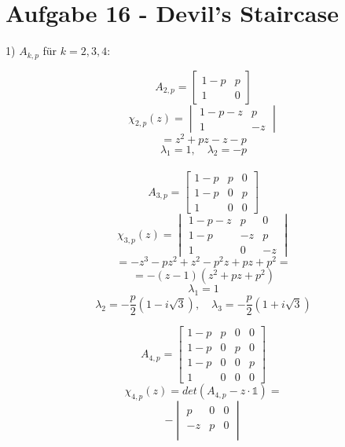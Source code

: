 \section*{Aufgabe 16 - Devil's Staircase}
\begin{paragraph}{1)}
  $A_{k,p}$ für $k = 2, 3, 4$:

  \begin{minipage}{0.4\linewidth}
  \[ A_{2,p} = \begin{bmatrix} 1-p & p \\ 1 & 0 \end{bmatrix} \]
  \[ \chi_{2,p}(z) = \begin{vmatrix} 1-p-z & p \\ 1 & -z \end{vmatrix} \]
  \[ = z^{2} + pz - z - p \]
  \[ \lambda_{1} = 1, \quad \lambda_{2}= -p \] \\[0.5em]
  \[ A_{3,p} = \begin{bmatrix} 1-p & p & 0 \\
                               1-p & 0 & p \\
                                 1 & 0 & 0 \end{bmatrix} \]
  \[ \chi_{3,p}(z) = \begin{vmatrix} 1-p-z & p  & 0 \\
                                       1-p   & -z & p \\
                                       1     & 0  & -z \end{vmatrix} \]
  \[ = -z^{3} - pz^{2} + z^{2} - p^{2}z + pz + p^{2} = \]
  \[ = -(z - 1) (z^{2} + pz + p^{2}) \]
  \[ \lambda_{1}= 1 \]
  \[ \lambda_{2}= -\frac{p}{2}(1 - i\sqrt{3}), \quad
     \lambda_{3}= -\frac{p}{2}(1 + i\sqrt{3}) \]
  \end{minipage}\hfill\begin{minipage}{0.5\linewidth}
  \[ A_{4,p} = \begin{bmatrix} 1-p & p & 0 & 0 \\
                               1-p & 0 & p & 0 \\
                               1-p & 0 & 0 & p \\
                                 1 & 0 & 0 & 0 \end{bmatrix} \]
  \[ \chi_{4,p}(z) = det(A_{4,p} - z\cdot \mathds{1}) = \]
  \[                 -\begin{vmatrix} p & 0 & 0 \\
                                     -z & p & 0 \\

\end{vmatrix}\]
\end{minipage}
\end{paragraph}
